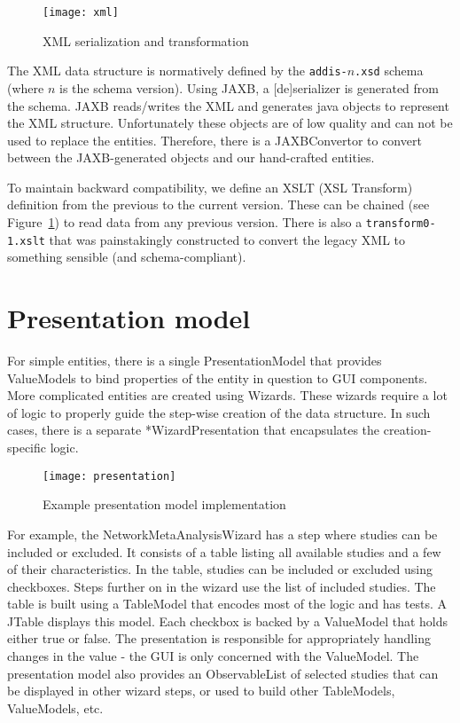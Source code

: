 \documentclass[a4paper]{article}
\begin{document}
\begin{figure}[h]
\centering
\texttt{[image: xml]}
\caption{XML serialization and transformation}
\label{fig:xml}
\end{figure}

The XML data structure is normatively defined by the {\tt addis-$n$.xsd} schema (where $n$ is the schema version).
Using JAXB, a [de]serializer is generated from the schema.
JAXB reads/writes the XML and generates java objects to represent the XML structure.
Unfortunately these objects are of low quality and can not be used to replace the entities.
Therefore, there is a JAXBConvertor to convert between the JAXB-generated objects and our hand-crafted entities.

To maintain backward compatibility, we define an XSLT (XSL Transform) definition from the previous to the current version.
These can be chained (see Figure~\ref{fig:xml}) to read data from any previous version.
There is also a {\tt transform0-1.xslt} that was painstakingly constructed to convert the legacy XML to something sensible (and schema-compliant).

\section{Presentation model}

For simple entities, there is a single PresentationModel that provides ValueModels to bind properties of the entity in question to GUI components.
More complicated entities are created using Wizards.
These wizards require a lot of logic to properly guide the step-wise creation of the data structure.
In such cases, there is a separate *WizardPresentation that encapsulates the creation-specific logic.

\begin{figure}[h]
\centering
\texttt{[image: presentation]}
\caption{Example presentation model implementation}
\end{figure}

For example, the NetworkMetaAnalysisWizard has a step where studies can be included or excluded.
It consists of a table listing all available studies and a few of their characteristics.
In the table, studies can be included or excluded using checkboxes.
Steps further on in the wizard use the list of included studies.
The table is built using a TableModel that encodes most of the logic and has tests.
A JTable displays this model.
Each checkbox is backed by a ValueModel that holds either true or false.
The presentation is responsible for appropriately handling changes in the value - the GUI is only concerned with the ValueModel.
The presentation model also provides an ObservableList of selected studies that can be displayed in other wizard steps, or used to build other TableModels, ValueModels, etc.
\end{document}
